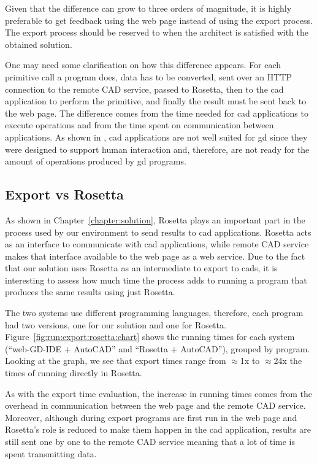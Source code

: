 Given that the difference can grow to three orders of magnitude, it is highly preferable to get feedback using the web page instead of using the export process.
The export process should be reserved to when the architect is satisfied with the obtained solution.

One may need some clarification on how this difference appears.
For each primitive call a program does, data has to be converted, sent over an HTTP connection to the remote CAD service, passed to Rosetta, then to the \gls{cad} application to perform the primitive, and finally the result must be sent back to the web page.
The difference comes from the time needed for \gls{cad} applications to execute operations and from the time spent on communication between applications.
As shown in \cite{Leitao2014illustrated}, \gls{cad} applications are not well suited for \gls{gd} since they were designed to support human interaction and, therefore, are not ready for the amount of operations produced by \gls{gd} programs.


\subsection{Export vs Rosetta}
As shown in Chapter~\ref{chapter:solution}, Rosetta plays an important part in the process used by our environment to send results to \gls{cad} applications.
Rosetta acts as an interface to communicate with \gls{cad} applications, while remote CAD service makes that interface available to the web page as a web service.
Due to the fact that our solution uses Rosetta as an intermediate to export to \glspl{cad}, it is interesting to assess how much time the process adds to running a program that produces the same results using just Rosetta.

The two systems use different programming languages, therefore, each program had two versions, one for our solution and one for Rosetta.
Figure~\ref{fig:run:export:rosetta:chart} shows the running times for each system (``web-GD-IDE + AutoCAD'' and ``Rosetta + AutoCAD''), grouped by program.
Looking at the graph, we see that export times range from $\approx$1x to $\approx$24x the times of running directly in Rosetta.

As with the export time evaluation, the increase in running times comes from the overhead in communication between the web page and the remote CAD service.
Moreover, although during export programs are first run in the web page and Rosetta's role is reduced to make them happen in the \gls{cad} application, results are still sent one by one to the remote CAD service meaning that a lot of time is spent transmitting data.

